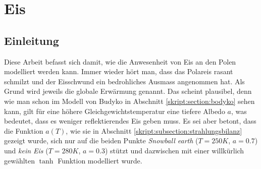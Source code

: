 %
%
%
\chapter{Eis\label{chapter:eis}}
\begin{refsection}

\section{Einleitung}
Diese Arbeit befasst sich damit, wie die Anwesenheit von Eis an den Polen modelliert werden kann. Immer wieder hört man, dass das Polareis rasant schmilzt und der Eisschwund ein bedrohliches Ausmass angenommen hat. Als Grund wird jeweils die globale Erwärmung genannt. Das scheint plausibel, denn wie man schon im Modell von Budyko in Abschnitt \ref{skript:section:bodyko} sehen kann, gilt für eine höhere Gleichgewichtstemperatur eine tiefere Albedo $a$, was bedeutet, dass es weniger reflektierendes Eis geben muss. Es sei aber betont, dass die Funktion $a(T)$, wie sie in Abschnitt \ref{skript:subsection:strahlungsbilanz} gezeigt wurde, sich nur auf die beiden Punkte {\em Snowball earth} ($T=250K$, $a=0.7$) und {\em kein Eis} ($T=280K$, $a=0.3$) stützt und dazwischen mit einer willkürlich gewählten $\tanh$ Funktion modelliert wurde. 

\end{refsection}
